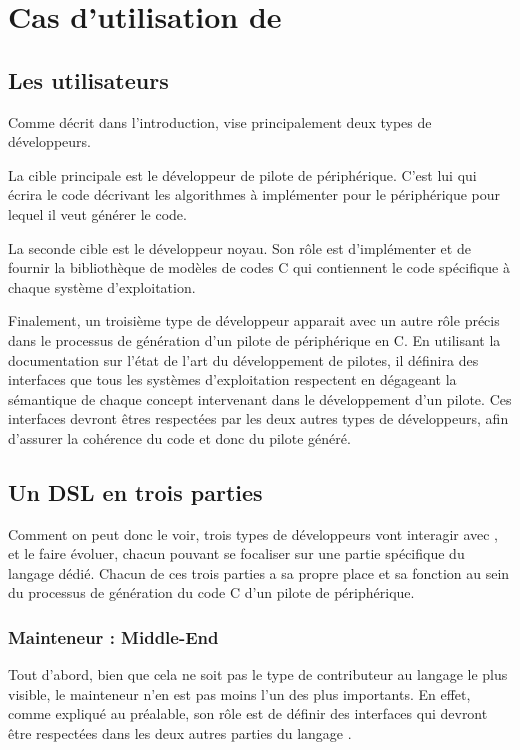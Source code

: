\documentclass[french]{rtxreport}
\begin{document}
\chapter{Cas d'utilisation de \rtx}

\section{Les utilisateurs}

Comme décrit dans l'introduction, \rtx vise principalement deux types de
développeurs.

La cible principale est le développeur de pilote de périphérique. C'est lui qui
écrira le code décrivant les algorithmes à implémenter pour le périphérique pour
lequel il veut générer le code.

La seconde cible est le développeur noyau. Son rôle est d'implémenter et de
fournir la bibliothèque de modèles de codes C qui contiennent le code
spécifique à chaque système d'exploitation.

Finalement, un troisième type de développeur apparait avec un autre rôle précis
dans le processus de génération d'un pilote de périphérique en C. En utilisant
la documentation sur l'état de l'art du développement de pilotes, il définira
des interfaces que tous les systèmes d'exploitation respectent en dégageant la
sémantique de chaque concept intervenant dans le développement d'un pilote. Ces
interfaces devront êtres respectées par les deux autres types de développeurs,
afin d'assurer la cohérence du code et donc du pilote généré.

\section{Un DSL en trois parties}

Comment on peut donc le voir, trois types de développeurs vont interagir avec
\rtx, et le faire évoluer, chacun pouvant se focaliser sur une partie spécifique
du langage dédié. Chacun de ces trois parties a sa propre place et sa fonction
au sein du processus de génération du code C d'un pilote de périphérique.

\subsection{Mainteneur \rtx : Middle-End}
\lstset{language=rti}

Tout d'abord, bien que cela ne soit pas le type de contributeur au langage le
plus visible, le mainteneur \rtx n'en est pas moins l'un des plus importants.
En effet, comme expliqué au préalable, son rôle est de définir des interfaces
qui devront être respectées dans les deux autres parties du langage \rtx.
\end{document}

